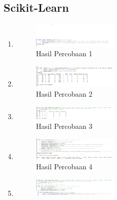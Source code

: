 \subsection{Scikit-Learn}
\begin{enumerate}
    \item \hfill \break 
	\begin{figure}[H]
		\includegraphics[width=4cm]{figures/1174035/chapter2/1.png}
		\centering
		\caption{Hasil Percobaan 1}
    \end{figure}
    \item \hfill \break 
	\begin{figure}[H]
		\includegraphics[width=4cm]{figures/1174035/chapter2/2.png}
		\centering
		\caption{Hasil Percobaan 2}
    \end{figure}
    \item \hfill \break 
	\begin{figure}[H]
		\includegraphics[width=4cm]{figures/1174035/chapter2/3.png}
		\centering
		\caption{Hasil Percobaan 3}
    \end{figure}
    \item \hfill \break 
	\begin{figure}[H]
		\includegraphics[width=4cm]{figures/1174035/chapter2/4.png}
		\centering
		\caption{Hasil Percobaan 4}
    \end{figure}
    \item \hfill \break 
	\begin{figure}[H]
		\includegraphics[width=4cm]{figures/1174035/chapter2/5.png}

\end{figure}
\end{enumerate}
